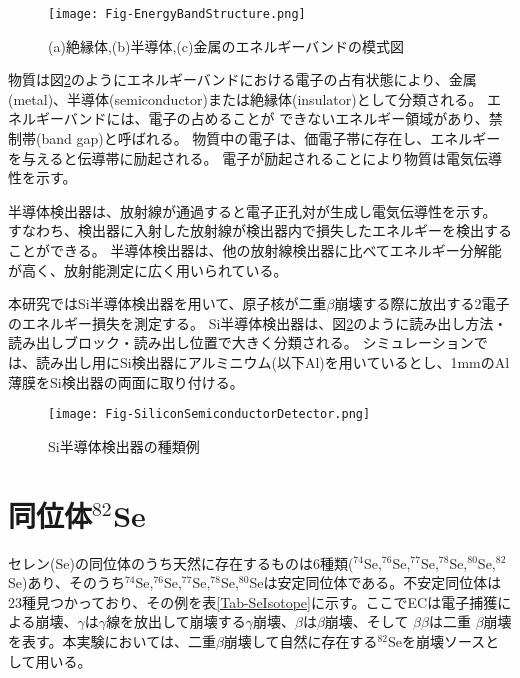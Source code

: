 \documentclass[a4paper,10pt]{jreport}
\begin{document}
\begin{figure}[H]
	\center
	\texttt{[image: Fig-EnergyBandStructure.png]}
	\caption{(a)絶縁体,(b)半導体,(c)金属のエネルギーバンドの模式図\cite{TUS_text}} \label{Fig-SiliconSemiconductorDetector}
\end{figure}

物質は図\ref{Fig-SiliconSemiconductorDetector}のようにエネルギーバンドにおける電子の占有状態により、金属(metal)、半導体(semiconductor)または絶縁体(insulator)として分類される。
エネルギーバンドには、電子の占めることが できないエネルギー領域があり、禁制帯(band gap)と呼ばれる。
物質中の電子は、価電子帯に存在し、エネルギーを与えると伝導帯に励起される。
電子が励起されることにより物質は電気伝導性を示す。

半導体検出器は、放射線が通過すると電子正孔対が生成し電気伝導性を示す。
すなわち、検出器に入射した放射線が検出器内で損失したエネルギーを検出することができる。
半導体検出器は、他の放射線検出器に比べてエネルギー分解能が高く、放射能測定に広く用いられている。

本研究ではSi半導体検出器を用いて、原子核が二重$\beta$崩壊する際に放出する2電子のエネルギー損失を測定する。
Si半導体検出器は、図\ref{Fig-SiliconSemiconductorDetector}のように読み出し方法・読み出しブロック・読み出し位置で大きく分類される。
シミュレーションでは、読み出し用にSi検出器にアルミニウム(以下Al)を用いているとし、1mmのAl薄膜をSi検出器の両面に取り付ける。

\begin{figure}[H]
	\center
	\texttt{[image: Fig-SiliconSemiconductorDetector.png]}
	\caption{Si半導体検出器の種類例\cite{hamamatsuHP}} \label{Fig-SiliconSemiconductorDetector}
\end{figure}



\section{同位体$^{82}$Se}

セレン(Se)の同位体のうち天然に存在するものは6種類($^{74}$Se,$^{76}$Se,$^{77}$Se,$^{78}$Se,$^{80}$Se,$^{82}$Se)あり、そのうち$^{74}$Se,$^{76}$Se,$^{77}$Se,$^{78}$Se,$^{80}$Seは安定同位体である。不安定同位体は23種見つかっており、その例を表\ref{Tab-SeIsotope}に示す。ここでECは電子捕獲による崩壊、$\gamma$は$\gamma$線を放出して崩壊する$\gamma$崩壊、$\beta$は$\beta$崩壊、そして $\beta\beta$は二重 $\beta$崩壊を表す。本実験においては、二重$\beta$崩壊して自然に存在する$^{82}$Seを崩壊ソースとして用いる。
\end{document}
